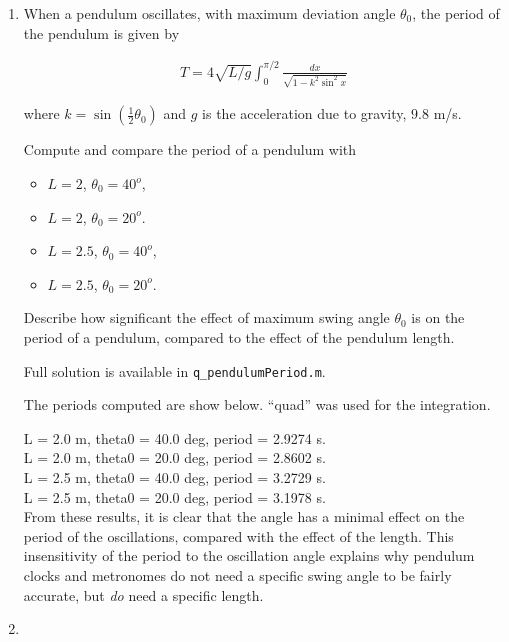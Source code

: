 \begin{enumerate}[1.]
\item 
  \begin{Question}
    
When a pendulum oscillates, with maximum deviation angle
  $\theta_0$, the period of the pendulum is given by

\begin{align*}
  T = 4 \sqrt{L/g} \int_0^{\pi/2} \frac{dx}{\sqrt{1 - k^2 \sin^2 x}}
\end{align*}

where $k = \sin\left(\frac{1}{2} \theta_0\right)$ and $g$ is the
acceleration due to gravity, $9.8 $ m/s.

Compute and compare the period of a pendulum with 
\begin{itemize}
\item $L = 2$, $\theta_0 = 40^o$, 
\item $L =2$, $\theta_0 = 20^o$.
\item $L = 2.5$, $\theta_0 = 40^o$, 
\item $L =2.5$, $\theta_0 = 20^o$.
\end{itemize}

Describe how significant the effect of maximum swing angle $\theta_0$
is on the period of a pendulum, compared to the effect of the pendulum
length.
  \end{Question}

\begin{Solution} 
 Full solution is available in \verb#q_pendulumPeriod.m#.

  The periods computed are show below.  ``quad'' was used for the
  integration.

L = 2.0 m, theta0 = 40.0 deg, period = 2.9274 s. \\
L = 2.0 m, theta0 = 20.0 deg, period = 2.8602 s. \\
L = 2.5 m, theta0 = 40.0 deg, period = 3.2729 s. \\
L = 2.5 m, theta0 = 20.0 deg, period = 3.1978 s. \\

From these results, it is clear that the angle has a minimal effect on
the period of the oscillations, compared with the effect of the
length.  This insensitivity of the period to the oscillation angle
explains why pendulum clocks and metronomes do not need a specific
swing angle to be fairly accurate, but {\em do} need a specific
length.
\end{Solution} 


\item
\begin{Question}
    

\end{Question}
\end{enumerate}
